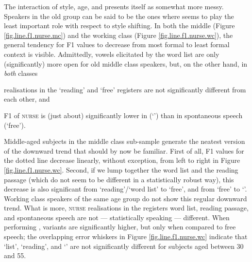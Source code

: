The interaction of style, age, and  presents itself as somewhat more messy.
Speakers in the old group can be said to be the ones where  seems to play the least important role with respect to style shifting.
In both the middle (Figure \ref{fig.line.f1.nurse.mc}) and the working class (Figure \ref{fig.line.f1.nurse.wc}), the general tendency for F1 values to decrease from most formal to least formal context is visible.
Admittedly, vowels elicitated by the word list are only (significantly) more open for old middle class speakers, but, on the other hand, in \emph{both} classes
\begin{inparaenum}[(a)]
	\item realisations in the `reading' and `free' registers are not significantly different from each other, and
	\item F1 of \textsc{nurse} is (just about) significantly lower in  (`') than in spontaneous speech (`free').
\end{inparaenum}

Middle-aged subjects in the middle class sub-sample generate the neatest version of the downward trend that should by now be familiar.
First of all, F1 values for the dotted line decrease linearly, without exception, from left to right in Figure \ref{fig.line.f1.nurse.wc}.
Second, if we lump together the word list and the reading passage (which do not seem to be different in a statistically robust way), this decrease is also significant from `reading'/`word list' to `free', and from `free' to `'.
Working class speakers of the same age group do not show this regular downward trend.
What is more, \textsc{nurse} realisations in the registers word list, reading passage, and spontaneous speech are not --- statistically speaking --- different.
When performing , variants are significantly higher, but only when compared to free speech; the overlapping error whiskers in Figure \ref{fig.line.f1.nurse.wc} indicate that `list', `reading', and `' are not significantly different for subjects aged between 30 and 55.

